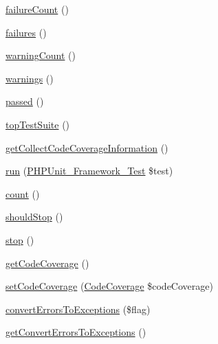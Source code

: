 \begin{DoxyCompactItemize}
\item 
\mbox{\hyperlink{class_p_h_p_unit___framework___test_result_a6678e4a6278a9f5d62d9dfca93037d21}{failure\+Count}} ()
\item 
\mbox{\hyperlink{class_p_h_p_unit___framework___test_result_ac28c0e12984d4b79034a20bd7900c846}{failures}} ()
\item 
\mbox{\hyperlink{class_p_h_p_unit___framework___test_result_a4d7b280010e55a2e1507ee27238ae744}{warning\+Count}} ()
\item 
\mbox{\hyperlink{class_p_h_p_unit___framework___test_result_a73ecff6b44e40412d4243afcd0e3fdfc}{warnings}} ()
\item 
\mbox{\hyperlink{class_p_h_p_unit___framework___test_result_a846b7d46e6d54e369e91f13b8326ec50}{passed}} ()
\item 
\mbox{\hyperlink{class_p_h_p_unit___framework___test_result_aa33c8c3faf0ba9df95724156d2781d79}{top\+Test\+Suite}} ()
\item 
\mbox{\hyperlink{class_p_h_p_unit___framework___test_result_a2dccc18aecd7ffd8b64bcc35474cb9b1}{get\+Collect\+Code\+Coverage\+Information}} ()
\item 
\mbox{\hyperlink{class_p_h_p_unit___framework___test_result_abb4583d5b3f6dbe088384b34c723d17d}{run}} (\mbox{\hyperlink{interface_p_h_p_unit___framework___test}{P\+H\+P\+Unit\+\_\+\+Framework\+\_\+\+Test}} \$test)
\item 
\mbox{\hyperlink{class_p_h_p_unit___framework___test_result_ac751e87b3d4c4bf2feb03bee8b092755}{count}} ()
\item 
\mbox{\hyperlink{class_p_h_p_unit___framework___test_result_a88a4b5f128be3ffa5693810cc5aa9909}{should\+Stop}} ()
\item 
\mbox{\hyperlink{class_p_h_p_unit___framework___test_result_a8b6fc76a620d7557d06e9a11a9ffb509}{stop}} ()
\item 
\mbox{\hyperlink{class_p_h_p_unit___framework___test_result_a6b35ed82a889c6e3176d7c13d4dd5e57}{get\+Code\+Coverage}} ()
\item 
\mbox{\hyperlink{class_p_h_p_unit___framework___test_result_a5ab649d337f5760ed5069d57c53ea23e}{set\+Code\+Coverage}} (\mbox{\hyperlink{class_sebastian_bergmann_1_1_code_coverage_1_1_code_coverage}{Code\+Coverage}} \$code\+Coverage)
\item 
\mbox{\hyperlink{class_p_h_p_unit___framework___test_result_aabd222cedd97510334768465176893f9}{convert\+Errors\+To\+Exceptions}} (\$flag)
\item 
\mbox{\hyperlink{class_p_h_p_unit___framework___test_result_a7e774057da18b942325b1f8623862836}{get\+Convert\+Errors\+To\+Exceptions}} ()

\end{DoxyCompactItemize}

